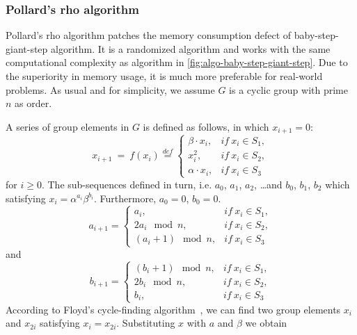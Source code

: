\documentclass[12pt,journal,compsoc]{IEEEtran}
\begin{document}
\subsubsection{\qquad Pollard's rho algorithm}
\label{sec:poll-rho-algor-1}

Pollard's rho algorithm patches the memory consumption defect of
baby-step-giant-step algorithm. It is a randomized algorithm and works
with the same computational complexity as algorithm in
\autoref{fig:algo-baby-step-giant-step}. Due to the superiority in
memory usage, it is much more preferable for real-world problems. As
usual and for simplicity, we assume $G$ is a cyclic group with prime
$n$ as order.
\par
A series of group elements in $G$ is defined as follows, in which
$x_{i+1}=0$: 
\begin{equation}
  \label{eq:pollard-1}
  x_{i+1}~=~f(x_{i})\overset{def}{=}
  \begin{cases}
    \beta\cdot x_{i}, & if~x_{i}\in S_{1},\\
    x_{i}^{2}, & if~x_{i}\in S_{2},\\
    \alpha\cdot x_{i}, & if~x_{i}\in S_{3}
  \end{cases}
\end{equation}
for $i\geq 0$. The sub-sequences defined in turn, i.e. $a_{0}$,
$a_{1}$, $a_{2}$, \ldots and $b_{0}$, $b_{1}$,
$b_{2}$ which satisfying
$x_{i}=\alpha^{a_{i}}\beta^{b_{i}}$. Furthermore, $a_{0}=0$,
$b_{0}=0$. 
\begin{equation}
  \label{eq:pollard-2}
  a_{i+1}=
  \begin{cases}
    a_{i}, & if~x_{i}\in S_{1},\\
    2a_{i}\mod n, & if~x_{i}\in S_{2},\\
    (a_{i}+1)\mod n, & if~x_{i}\in S_{3}
  \end{cases}
\end{equation}
and
\begin{equation}
  \label{eq:pollard-3}
  b_{i+1}=
  \begin{cases}
    (b_{i}+1)\mod n, & if~x_{i}\in S_{1},\\
    2b_{i}\mod n, & if~x_{i}\in S_{2},\\
    b_{i}, & if~x_{i}\in S_{3}
  \end{cases}
\end{equation}
According to Floyd's cycle-finding
algorithm~\cite{Knuth:1997:ACP:270146}, we can find two group elements
$x_{i}$ and $x_{2i}$ satisfying $x_{i}=x_{2i}$. Substituting $x$ with
$a$ and $\beta$ we obtain
\end{document}
